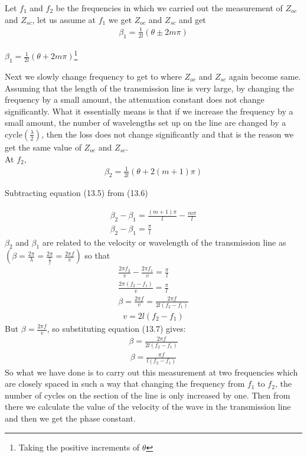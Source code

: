 Let $f_1$ and $f_2$ be the frequencies in which we carried out the measurement of  $Z_{oc}$ and $Z_{sc}$, let us assume at $f_1$ we get  $Z_{oc}$ and $Z_{sc}$ and get
\begin{align*}
\beta_1 = \frac{1}{2l}(\theta \pm 2m\pi)
\end{align*}
\begin{center}
$\beta_1= \frac{1}{2l}(\theta + 2m\pi)$\footnote{Taking the positive increments of $\theta$}
\end{center}
Next we slowly change frequency to get to where $Z_{oc}$ and $Z_{sc}$ again become same. Assuming that the length of the transmission line is very large, by changing the frequency by a small amount, the attenuation constant does not change significantly. What it essentially means is that if we increase the frequency by a small amount, the number of wavelengths set up on the line are changed by a cycle$(\frac{\lambda}{2})$, then the loss does not change significantly and that is the reason we get the same value of $Z_{oc}$ and $Z_{sc}$.\\At $f_2$,
\begin{align}
\beta_2 = \frac{1}{2l}(\theta + 2(m + 1)\pi)
\end{align}
\begin{center}
Subtracting equation (13.5) from (13.6)
\end{center}
\begin{align*}
\beta_2 - \beta_1 = \frac{(m + 1)\pi}{l} - \frac{m\pi}{l}\\
\beta_2 - \beta_1 = \frac{\pi}{l}
\end{align*}
$\beta_2$ and $\beta_1$ are related to the velocity or wavelength of the transmission line as $( \beta = \frac{2\pi}{\lambda} = \frac{2\pi}{\frac{v}{f}} = \frac{2\pi f}{v})$ so that
\begin{align*}
\frac{2\pi f_2}{v} - \frac{2\pi f_1}{v} = \frac{\pi}{l}\\
\frac{2\pi(f_2 - f_1)}{v} = \frac{\pi}{l}\\
\beta = \frac{2\pi f}{v} = \frac{2\pi f}{2l(f_2 - f_1)}
\end{align*}
\begin{align}
v = 2l(f_2-f_1)
\end{align}
But $\beta = \frac{2\pi f}{v}$, so substituting equation (13.7) gives:
\begin{align*}
\beta = \frac{2\pi f}{2l(f_2 - f_1)}
\end{align*}
\begin{align}
\beta = \frac{\pi f}{l(f_2 - f_1)}
\end{align}
So what we have done is to carry out this measurement at two frequencies which are closely spaced in such a way that changing the frequency from $f_1$ to $f_2$, the number of cycles on the section of the line is only increased by one. Then from there we calculate the value of the velocity of the wave in the transmission line and then we get the phase constant.

